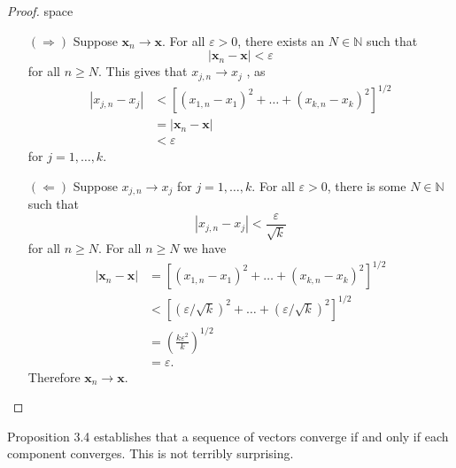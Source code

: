 \documentclass{article}
\newcommand{\N}{\mathbb{N}}
\newcommand{\x}{\mathbf{x}}
\theoremstyle{definition}
\begin{document}
	\begin{proof}{\color{white}space}
		\begin{enumerate}
			\item [$ (\Longrightarrow) $] Suppose $ \x_n\to \x $. For all $ \varepsilon>0 $, there exists an $ N\in\N $ such that $$|\x_n-\x|<\varepsilon $$ for all $ n\ge N $. This gives that  $ x_{j,n}\to x_j $ , as
			\begin{align*}
				|x_{j,n}- x_j|&<\left[(x_{1,n}- x_1)^2+\ldots+(x_{k,n}- x_k)^2\right]^{1/2}\\&=|\x_n-\x|\\&<\varepsilon
			\end{align*}  for $ j=1,\ldots,k $. 
			\item [$ (\Longleftarrow) $]  Suppose $ x_{j,n}\to x_j  $ for $ j=1,\ldots,k $. For all $ \varepsilon>0 $, there is some $ N\in\N $ such that $$ |x_{j,n}-x_j|<\frac{\varepsilon}{\sqrt{k}}$$ for all $ n\ge N $. For all $ n\ge N $ we have 
			\begin{align*}
				|\x_n-\x|&=\left[(x_{1,n}- x_1)^2+\ldots+(x_{k,n}- x_k)^2\right]^{1/2}\\&<\left[(\varepsilon/\sqrt{k})^2+\ldots+(\varepsilon/\sqrt{k})^2\right]^{1/2}\\&=\left(\frac{k\varepsilon^2}{k}\right)^{1/2}\\&=\varepsilon.
			\end{align*}
			Therefore $ \x_n\to \x $.
		\end{enumerate}
	\end{proof}
	Proposition 3.4 establishes that a sequence of vectors converge if and only if each component converges. This is not terribly surprising. 
\end{document}
